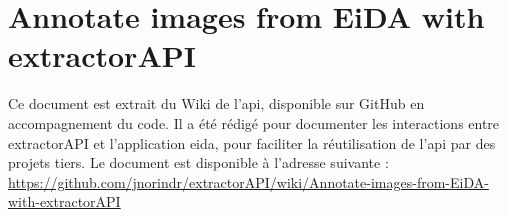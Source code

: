\documentclass[a4paper,12pt,twoside]{book}
\newcommand{\api}{\gls{api}\xspace}
\newcommand{\eida}{\gls{eida}\xspace}
\newcommand{\exapi}{extractorAPI\xspace}
\newcommand{\clearemptydoublepage}{\newpage{\pagestyle{empty}\cleardoublepage}}
\begin{document}
	\chapter[Annotate images with extractorAPI]{\label{exapiAnno}Annotate images from EiDA with extractorAPI}
		Ce document est extrait du Wiki de l'\api, disponible sur GitHub en accompagnement du code. Il a été rédigé pour documenter les interactions entre \exapi et l'application \eida, pour faciliter la réutilisation de l'\api par des projets tiers. Le document est disponible à l'adresse suivante : \url{https://github.com/jnorindr/extractorAPI/wiki/Annotate-images-from-EiDA-with-extractorAPI}
		
		\clearemptydoublepage

\backmatter
    \printacronyms[title=Liste des acronymes,toctitle=Acronymes]
    \printglossary
    \listoffigures
    \clearemptydoublepage
    \tableofcontents
\end{document}
